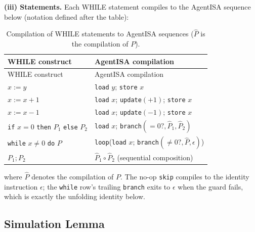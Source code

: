 \documentclass[
  11pt,
]{article}
\begin{document}
\textbf{(iii) Statements.} Each WHILE statement compiles to the AgentISA
sequence below (notation defined after the table):

\begin{longtable}[]{@{}
  >{\raggedright\arraybackslash}p{}
  >{\raggedright\arraybackslash}p{}@{}}
\caption{Compilation of WHILE statements to AgentISA sequences
(\(\hat{P}\) is the compilation of \(P\)).}\tabularnewline
\toprule\noalign{}
\begin{minipage}[b]{\linewidth}\raggedright
WHILE construct
\end{minipage} & \begin{minipage}[b]{\linewidth}\raggedright
AgentISA compilation
\end{minipage} \\
\midrule\noalign{}
\endfirsthead
\toprule\noalign{}
\begin{minipage}[b]{\linewidth}\raggedright
WHILE construct
\end{minipage} & \begin{minipage}[b]{\linewidth}\raggedright
AgentISA compilation
\end{minipage} \\
\midrule\noalign{}
\endhead
\bottomrule\noalign{}
\endlastfoot
\(x := y\) & \texttt{load} \(y\); \texttt{store} \(x\) \\
\(x := x+1\) & \texttt{load} \(x\); \texttt{update}\((+1)\);
\texttt{store} \(x\) \\
\(x := x-1\) & \texttt{load} \(x\); \texttt{update}\((-1)\);
\texttt{store} \(x\) \\
\texttt{if} \(x = 0\) \texttt{then} \(P_1\) \texttt{else} \(P_2\) &
\texttt{load} \(x\); \texttt{branch}\((= 0?, \hat{P}_1, \hat{P}_2)\) \\
\texttt{while} \(x \neq 0\) \texttt{do} \(P\) &
\texttt{loop}(\texttt{load} \(x\);
\texttt{branch}\((\neq 0?, \hat{P}, \epsilon)\)) \\
\(P_1 ; P_2\) & \(\hat{P}_1 \circ \hat{P}_2\) (sequential
composition) \\
\end{longtable}

where \(\hat{P}\) denotes the compilation of \(P\). The no-op
\texttt{skip} compiles to the identity instruction \(\epsilon\); the
\texttt{while} row's trailing \texttt{branch} exits to \(\epsilon\) when
the guard fails, which is exactly the unfolding identity below.

\subsection{Simulation Lemma}\label{simulation-lemma}
\end{document}
